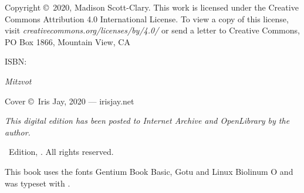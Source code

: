 {\small\parindent0pt\parskip5pt
\noindent Copyright \copyright\ 2020, Madison Scott-Clary. This work is licensed under the Creative Commons Attribution 4.0 International License. To view a copy of this license, visit \mbox{\emph{creativecommons.org/licenses/by/4.0/}} or send a letter to Creative Commons, PO Box 1866, Mountain View, CA

\vspace{1ex}

ISBN: \ISBN

\vspace{1ex}

\textit{Mitzvot}

\vspace{1ex}

Cover \copyright\ Iris Jay, 2020 --- irisjay.net

\vspace{1ex}

\textit{This digital edition has been posted to Internet Archive and OpenLibrary by the author.}

\Edition\ Edition, \Year. All rights reserved.

\vspace{1ex}

This book uses the fonts Gentium Book Basic, {\DisplayFont Gotu} and {\TitleFont Linux Biolinum O} and was typeset with {\XeLaTeX}.

}%

\clearpage
